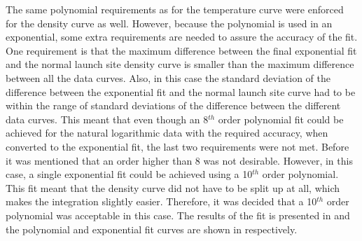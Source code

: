 The same polynomial requirements as for the temperature curve were enforced for the density curve as well. However, because the polynomial is used in an exponential, some extra requirements are needed to assure the accuracy of the fit. One requirement is that the maximum difference between the final exponential fit and the normal launch site density curve is smaller than the maximum difference between all the data curves. Also, in this case the standard deviation of the difference between the exponential fit and the normal launch site curve had to be within the range of standard deviations of the difference between the different data curves. This meant that even though an 8$^{th}$ order polynomial fit could be achieved for the natural logarithmic data with the required accuracy, when converted to the exponential fit, the last two requirements were not met. Before it was mentioned that an order higher than 8 was not desirable. However, in this case, a single exponential fit could be achieved using a 10$^{th}$ order polynomial. This fit meant that the density curve did not have to be split up at all, which makes the integration slightly easier. Therefore, it was decided that a 10$^{th}$ order polynomial was acceptable in this case. The results of the fit is presented in  and the polynomial and exponential fit curves are shown in  respectively.

%


%

